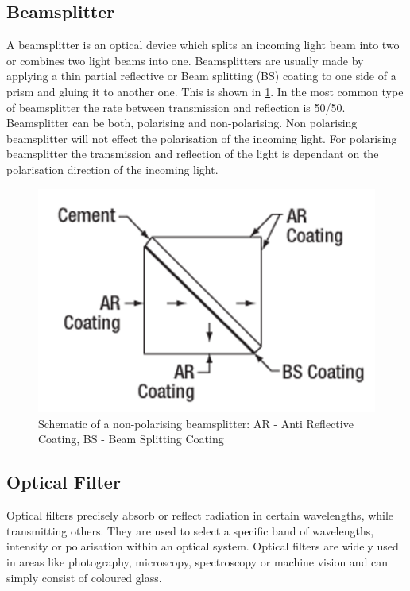 \subsection{Beamsplitter}
A beamsplitter is an optical device which splits an incoming light beam into two or combines two light beams into one. Beamsplitters are usually made by applying a thin partial reflective or Beam splitting (BS) coating to one side of a prism and gluing it to another one. This is shown in \ref{beamsplitter_shematic}. In the most common type of beamsplitter the rate between transmission and reflection is 50/50. Beamsplitter can be both, polarising and non-polarising. Non polarising beamsplitter will not effect the polarisation of the incoming light. For polarising beamsplitter the transmission and reflection of the light is dependant on the polarisation direction of the incoming light.\cite{ColourApperance}

\begin{figure}
\begin{center}
\includegraphics[width=12cm]{Pictures/Beamsplitter}
\caption[Schematic of a non-polarising beamsplitter]{Schematic of a non-polarising beamsplitter\cite{ThorlabsBeamsplitter}: AR - Anti Reflective Coating, BS - Beam Splitting Coating}
\label{beamsplitter_shematic}
\end{center}
\end{figure}

\subsection{Optical Filter}
Optical filters precisely absorb or reflect radiation in certain wavelengths, while transmitting others. They are used to select a specific band of wavelengths, intensity or polarisation within an optical system. Optical filters are widely used in areas like photography, microscopy, spectroscopy or machine vision and can simply consist of coloured glass.\cite{IDEXFilterSelection}\cite{LoefflerLang2020}

